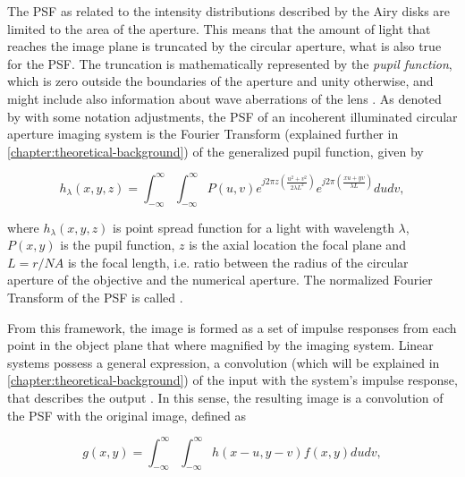The PSF as related to the intensity distributions described by the Airy disks are limited to the area of the aperture. This means that the amount of light that reaches the image plane is truncated by the circular aperture, what is also true for the PSF. The truncation is mathematically represented by the \emph{pupil function}, which is zero outside the boundaries of the aperture and unity otherwise, and might include also information about wave aberrations of the lens \cite{goodman1996introduction}. As denoted by  with some notation adjustments, the PSF of an incoherent illuminated circular aperture imaging system is the Fourier Transform (explained further in \autoref{chapter:theoretical-background}) of the generalized pupil function, given by

\begin{equation}
\label{eqn:incoherent_psf}
h_{\lambda}(x,y,z) = \int_{-\infty}^{\infty}
                     \int_{-\infty}^{\infty}
         P(u,v)
         e^{j 2 \pi z
            \left(
                \frac{u^{2} + v^{2}}{2 \lambda L^{2}}        
            \right)
        }
        e^{j 2 \pi
            \left(
                \frac{xu + yv}{\lambda L}        
            \right)
        }
        du dv,
\end{equation}

\noindent where $h_{\lambda}(x,y,z)$ is point spread function for a light with wavelength $\lambda$, $P(x,y)$ is the pupil function, $z$ is the axial location the focal plane and $L = r / NA$ is the focal length, i.e. ratio between the radius of the circular aperture of the objective and the numerical aperture. The normalized Fourier Transform of the PSF is called  \cite{castleman1996digital}.

From this framework, the image is formed as a set of impulse responses from each point in the object plane that where magnified by the imaging system. Linear systems possess a general expression, a convolution (which will be explained in \autoref{chapter:theoretical-background}) of the input with the system's impulse response, that describes the output \cite{brigham1988fast}. In this sense, the resulting image is a convolution of the PSF with the original image, defined as

\begin{equation}
\label{eqn:image_formation_convolution}
g(x,y) = \int_{-\infty}^{\infty}
         \int_{-\infty}^{\infty}
         h(x-u, y-v)f(x,y)du dv,
\end{equation}

